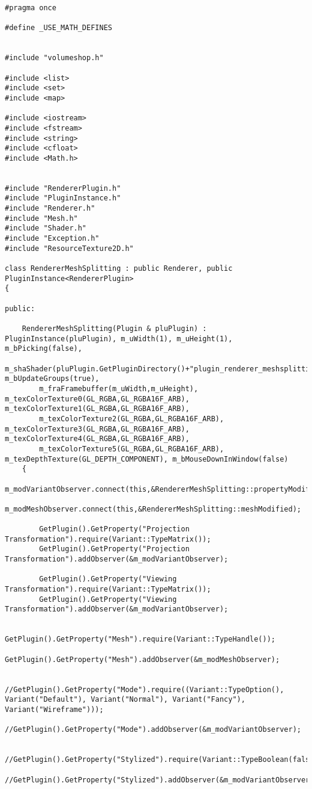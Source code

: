 \begin{verbatim}
#pragma once

#define _USE_MATH_DEFINES


#include "volumeshop.h"

#include <list>
#include <set>
#include <map>

#include <iostream>
#include <fstream>
#include <string>
#include <cfloat>
#include <Math.h>


#include "RendererPlugin.h"
#include "PluginInstance.h"
#include "Renderer.h"
#include "Mesh.h"
#include "Shader.h"
#include "Exception.h"
#include "ResourceTexture2D.h"

class RendererMeshSplitting : public Renderer, public PluginInstance<RendererPlugin>
{

public:

	RendererMeshSplitting(Plugin & pluPlugin) : PluginInstance(pluPlugin), m_uWidth(1), m_uHeight(1), m_bPicking(false), 
		m_shaShader(pluPlugin.GetPluginDirectory()+"plugin_renderer_meshsplitting.glsl"), m_bUpdateGroups(true), 
		m_fraFramebuffer(m_uWidth,m_uHeight), m_texColorTexture0(GL_RGBA,GL_RGBA16F_ARB), m_texColorTexture1(GL_RGBA,GL_RGBA16F_ARB), 
		m_texColorTexture2(GL_RGBA,GL_RGBA16F_ARB), m_texColorTexture3(GL_RGBA,GL_RGBA16F_ARB), m_texColorTexture4(GL_RGBA,GL_RGBA16F_ARB), 
		m_texColorTexture5(GL_RGBA,GL_RGBA16F_ARB), m_texDepthTexture(GL_DEPTH_COMPONENT), m_bMouseDownInWindow(false)
	{
		m_modVariantObserver.connect(this,&RendererMeshSplitting::propertyModified);
		m_modMeshObserver.connect(this,&RendererMeshSplitting::meshModified);

		GetPlugin().GetProperty("Projection Transformation").require(Variant::TypeMatrix());
		GetPlugin().GetProperty("Projection Transformation").addObserver(&m_modVariantObserver);

		GetPlugin().GetProperty("Viewing Transformation").require(Variant::TypeMatrix());
		GetPlugin().GetProperty("Viewing Transformation").addObserver(&m_modVariantObserver);

		GetPlugin().GetProperty("Mesh").require(Variant::TypeHandle());
		GetPlugin().GetProperty("Mesh").addObserver(&m_modMeshObserver);

		//GetPlugin().GetProperty("Mode").require((Variant::TypeOption(), Variant("Default"), Variant("Normal"), Variant("Fancy"), Variant("Wireframe")));
		//GetPlugin().GetProperty("Mode").addObserver(&m_modVariantObserver);

		//GetPlugin().GetProperty("Stylized").require(Variant::TypeBoolean(false));
		//GetPlugin().GetProperty("Stylized").addObserver(&m_modVariantObserver);


\end{verbatim}
